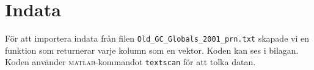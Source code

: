 \section{Indata}
\label{sec:indata}

För att importera indata från filen \lstinline|Old_GC_Globals_2001_prn.txt| skapade vi en funktion som returnerar varje kolumn som en vektor. Koden kan ses i bilagan. Koden använder \textsc{matlab}-kommandot \lstinline|textscan| för att tolka datan.
